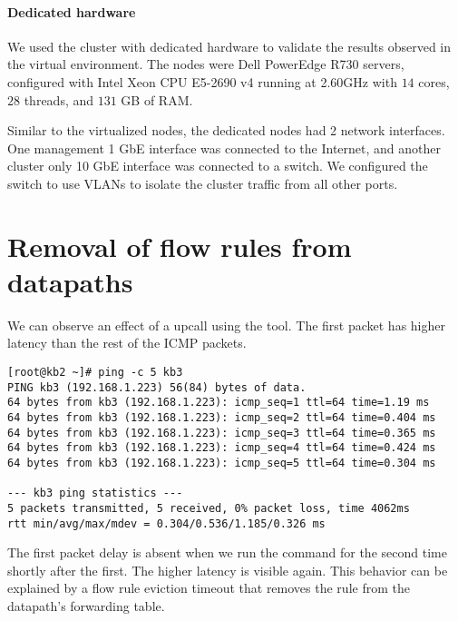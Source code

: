\paragraph{Dedicated hardware}

We used the cluster with dedicated hardware to validate the results observed in the virtual environment. The nodes were Dell PowerEdge R730 servers, configured with Intel\textsuperscript{\textregistered} Xeon\textsuperscript{\textregistered} CPU E5-2690 v4 running at 2.60GHz with $14$ cores, $28$ threads, and $131$ GB of RAM.

Similar to the virtualized nodes, the dedicated nodes had 2 network interfaces. One management 1 GbE interface was connected to the Internet, and another cluster only 10 GbE interface was connected to a switch. We configured the switch to use VLANs to isolate the cluster traffic from all other ports.


\section{Removal of flow rules from datapaths}
\label{design:flow-eviction}

We can observe an effect of a upcall using the  tool. The first packet has higher latency than the rest of the ICMP packets.

\vspace{0.5cm}

\begin{lstlisting}[caption=Output of the \ident{ping} command in the virtualized environment, captionpos=b, basicstyle=\ttfamily\scriptsize]
[root@kb2 ~]# ping -c 5 kb3
PING kb3 (192.168.1.223) 56(84) bytes of data.
64 bytes from kb3 (192.168.1.223): icmp_seq=1 ttl=64 time=1.19 ms
64 bytes from kb3 (192.168.1.223): icmp_seq=2 ttl=64 time=0.404 ms
64 bytes from kb3 (192.168.1.223): icmp_seq=3 ttl=64 time=0.365 ms
64 bytes from kb3 (192.168.1.223): icmp_seq=4 ttl=64 time=0.424 ms
64 bytes from kb3 (192.168.1.223): icmp_seq=5 ttl=64 time=0.304 ms

--- kb3 ping statistics ---
5 packets transmitted, 5 received, 0% packet loss, time 4062ms
rtt min/avg/max/mdev = 0.304/0.536/1.185/0.326 ms
\end{lstlisting}

The first packet delay is absent when we run the  command for the second time shortly after the first. The higher latency is visible again. This behavior can be explained by a flow rule eviction timeout that removes the rule from the datapath's forwarding table.

